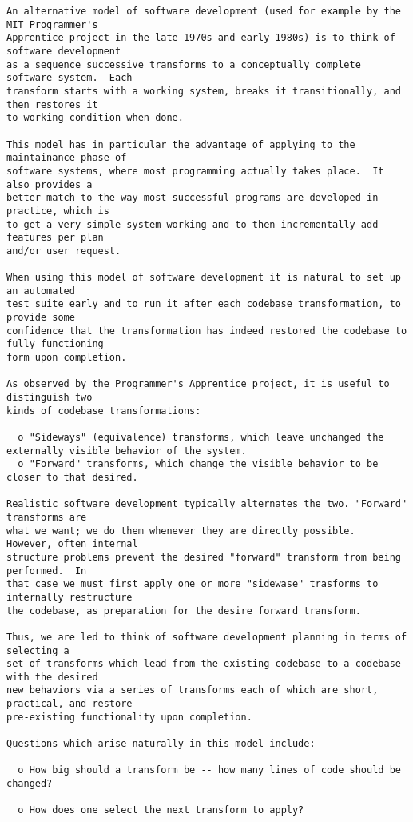 \begin{verbatim}
An alternative model of software development (used for example by the MIT Programmer's
Apprentice project in the late 1970s and early 1980s) is to think of software development
as a sequence successive transforms to a conceptually complete software system.  Each
transform starts with a working system, breaks it transitionally, and then restores it
to working condition when done.

This model has in particular the advantage of applying to the maintainance phase of
software systems, where most programming actually takes place.  It also provides a
better match to the way most successful programs are developed in practice, which is
to get a very simple system working and to then incrementally add features per plan
and/or user request.

When using this model of software development it is natural to set up an automated
test suite early and to run it after each codebase transformation, to provide some
confidence that the transformation has indeed restored the codebase to fully functioning
form upon completion.

As observed by the Programmer's Apprentice project, it is useful to distinguish two
kinds of codebase transformations:

  o "Sideways" (equivalence) transforms, which leave unchanged the externally visible behavior of the system.
  o "Forward" transforms, which change the visible behavior to be closer to that desired.

Realistic software development typically alternates the two. "Forward" transforms are
what we want; we do them whenever they are directly possible.  However, often internal
structure problems prevent the desired "forward" transform from being performed.  In
that case we must first apply one or more "sidewase" trasforms to internally restructure
the codebase, as preparation for the desire forward transform.

Thus, we are led to think of software development planning in terms of selecting a
set of transforms which lead from the existing codebase to a codebase with the desired
new behaviors via a series of transforms each of which are short, practical, and restore
pre-existing functionality upon completion.

Questions which arise naturally in this model include:

  o How big should a transform be -- how many lines of code should be changed?

  o How does one select the next transform to apply?





\end{verbatim}
